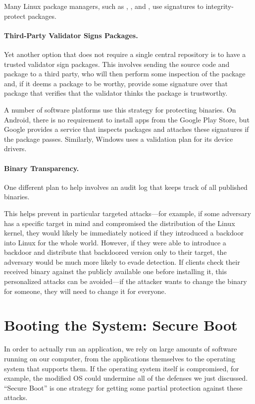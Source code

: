 Many Linux package managers, such 
as , , and , use 
signatures to integrity-protect packages.



\paragraph{Third-Party Validator Signs Packages.}
Yet another option that does not require a single central repository is to have a trusted validator sign packages. This involves sending the source code and package to a third party, who will then perform some inspection of the package and, if it deems a package to be worthy, provide some signature over that package that verifies that the validator thinks the package is trustworthy.

A number of software platforms use this strategy for protecting binaries.
On Android, there is no requirement to install apps from the Google Play Store, but Google provides a service that inspects packages and attaches these signatures if the package passes. Similarly, Windows uses a validation plan for its device drivers. 

\paragraph{Binary Transparency.}
One different plan to help involves an audit log that keeps track of all published binaries.

This helps prevent in particular targeted attacks---for example, if some adversary has a specific target in mind and compromised the distribution of the Linux kernel, they would likely be immediately noticed if they introduced a backdoor into Linux for the whole world. However, if they were able to introduce a backdoor and distribute that backdoored version only to their target, the adversary would be much more likely to evade detection. If clients check their received binary against the publicly available one before installing it, this personalized attacks can be avoided---if the attacker wants to change the binary for someone, they will need to change it for everyone.

\section{Booting the System: Secure Boot}
In order to actually run an application, we rely on large amounts of software running on our computer, from the applications themselves to the operating system that supports them.
If the operating system itself is compromised, for example, the modified OS could undermine all of the defenses we just discussed.
``Secure Boot'' is one strategy for getting some partial protection against these attacks.

